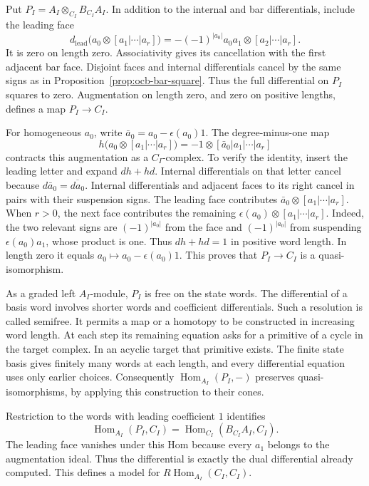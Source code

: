 Put $P_I=A_I\otimes_{C_I}B_{C_I}A_I$.
In addition to the internal and bar differentials, include the
leading face
\[
 d_{\mathrm{lead}}\bigl(a_0\otimes[a_1|\cdots|a_r]\bigr)
 =-(-1)^{|a_0|}a_0a_1\otimes[a_2|\cdots|a_r].
\]
It is zero on length zero.
Associativity gives its cancellation with the first adjacent bar
face. Disjoint faces and internal differentials cancel by the
same signs as in Proposition~\ref{prop:ocb-bar-square}.
Thus the full differential on $P_I$ squares to zero.
Augmentation on length zero, and zero on positive lengths,
defines a map $P_I\to C_I$.

For homogeneous $a_0$, write
$\bar a_0=a_0-\epsilon(a_0)1$.
The degree-minus-one map
\[
 h\bigl(a_0\otimes[a_1|\cdots|a_r]\bigr)
 =-1\otimes[\bar a_0|a_1|\cdots|a_r]
\]
contracts this augmentation as a $C_I$-complex.
To verify the identity, insert the leading letter and expand
$dh+hd$.
Internal differentials on that letter cancel because
$d\bar a_0=\overline{da_0}$.
Internal differentials and adjacent faces to its right cancel
in pairs with their suspension signs.
The leading face contributes
$\bar a_0\otimes[a_1|\cdots|a_r]$.
When $r>0$, the next face contributes the remaining
$\epsilon(a_0)\otimes[a_1|\cdots|a_r]$.
Indeed, the two relevant signs are $(-1)^{|a_0|}$ from the face
and $(-1)^{|a_0|}$ from suspending
$\epsilon(a_0)a_1$, whose product is one.
Thus $dh+hd=1$ in positive word length.
In length zero it equals $a_0\mapsto a_0-\epsilon(a_0)1$.
This proves that $P_I\to C_I$ is a quasi-isomorphism.

As a graded left $A_I$-module, $P_I$ is free on the state words.
The differential of a basis word involves shorter words and
coefficient differentials.
Such a resolution is called semifree.
It permits a map or a homotopy to be constructed in increasing
word length. At each step its remaining equation asks for a
primitive of a cycle in the target complex.
In an acyclic target that primitive exists.
The finite state basis gives finitely many words at each length,
and every differential equation uses only earlier choices.
Consequently $\operatorname{Hom}_{A_I}(P_I,-)$ preserves
quasi-isomorphisms, by applying this construction to their cones.

Restriction to the words with leading coefficient $1$ identifies
\[
 \operatorname{Hom}_{A_I}(P_I,C_I)
 =\operatorname{Hom}_{C_I}(B_{C_I}A_I,C_I).
\]
The leading face vanishes under this Hom because every $a_1$
belongs to the augmentation ideal.
Thus the differential is exactly the dual differential already
computed. This defines a model for
$R\operatorname{Hom}_{A_I}(C_I,C_I)$.

